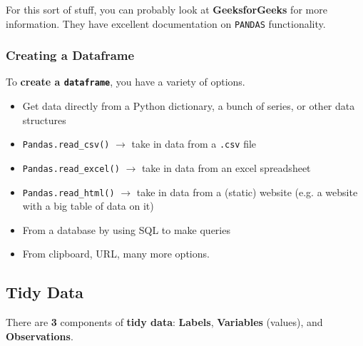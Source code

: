 \documentclass[english, 10pt]{article}
\begin{document}
\hfill \break For this sort of stuff, you can probably look at \textbf{GeeksforGeeks} for more information. They have excellent documentation on \texttt{PANDAS} functionality.

\subsubsection{Creating a Dataframe}

To \textbf{create a \texttt{dataframe}}, you have a variety of options.

\begin{itemize}
	\item Get data directly from a Python dictionary, a bunch of series, or other data structures
	\item \texttt{Pandas.read\_csv()} $\rightarrow$ take in data from a \texttt{.csv} file
	\item \texttt{Pandas.read\_excel()} $\rightarrow$ take in data from an excel spreadsheet
	\item \texttt{Pandas.read\_html()} $\rightarrow$ take in data from a (static) website (e.g. a website with a big table of data on it)
	\item From a database by using SQL to make queries
	\item From clipboard, URL, many more options.
\end{itemize}

\subsection{Tidy Data}

There are \textbf{3} components of \textbf{tidy data}: \textbf{Labels},  \textbf{Variables} (values), and \textbf{Observations}.\\
\end{document}
